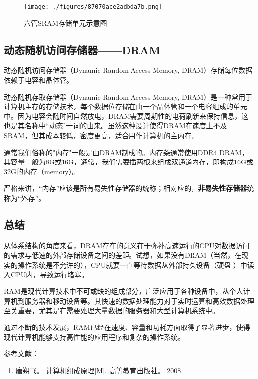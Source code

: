 \begin{figure}[ht]
\centering
\texttt{[image: ./figures/87070ace2adbda7b.png]}
\caption{六管SRAM存储单元示意图} \label{fig_RAM_3}
\end{figure}


\subsection{动态随机访问存储器——DRAM}

动态随机访问存储器（Dynamic Random-Access Memory, DRAM）存储每位数据依赖于电容和晶体管。

动态随机存取存储器（Dynamic Random-Access Memory, DRAM）是一种常用于计算机主存的存储技术，每个数据位存储在由一个晶体管和一个电容组成的单元中。因为电容会随时间自然放电，DRAM需要周期性的电荷刷新来保持信息，这也是其名称中“动态”一词的由来。虽然这种设计使得DRAM在速度上不及SRAM，但其成本较低，密度更高，适合用作计算机的主内存。

通常我们俗称的"内存"一般是由DRAM制成的。内存条通常使用DDR4 DRAM，其容量一般为8G或16G，通常，我们需要插两根来组成双通道内存，即构成16G或32G的内存（memory）。

严格来讲，“内存”应该是所有易失性存储器的统称；相对应的，\textbf{非易失性存储器}统称为“外存”。


\subsection{总结}
从体系结构的角度来看，DRAM存在的意义在于弥补高速运行的CPU对数据访问的需求与低速的外部存储设备之间的差距。试想，如果没有DRAM（当然，在现实的操作系统是不允许的），CPU就要一直等待数据从外部持久设备（硬盘 ）中读入CPU内，导致运行堵塞。

RAM是现代计算技术中不可或缺的组成部分，广泛应用于各种设备中，从个人计算机到服务器和移动设备等。其快速的数据处理能力对于实时运算和高效数据处理至关重要，尤其是在需要处理大量数据的服务器和大型计算机系统中。

通过不断的技术发展，RAM已经在速度、容量和功耗方面取得了显著进步，使得现代计算机能够支持高性能的应用程序和复杂的操作系统。


参考文献：
\begin{enumerate}
\item 唐朔飞。 计算机组成原理[M]. 高等教育出版社。 2008
\end{enumerate}
